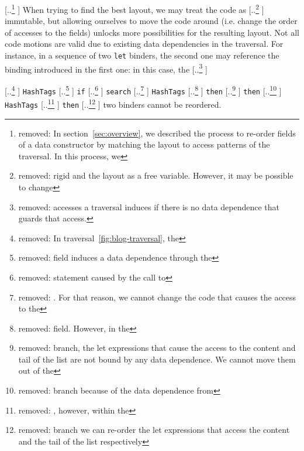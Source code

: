 \documentclass[acmsmall,review,anonymous]{acmart}\settopmatter{printfolios=true,printccs=false,printacmref=false}
\providecommand{\DIFaddtex}[1]{{\protect\color{blue} \sf #1}} %
\providecommand{\DIFdeltex}[1]{{\protect\color{red} [..\footnote{removed: #1} ]}} %
\providecommand{\DIFaddbegin}{} %
\providecommand{\DIFaddend}{} %
\providecommand{\DIFdelbegin}{} %
\providecommand{\DIFdelend}{} %
\providecommand{\DIFadd}[1]{\texorpdfstring{\DIFaddtex{#1}}{#1}} %
\providecommand{\DIFdel}[1]{\texorpdfstring{\DIFdeltex{#1}}{}} %
\newcommand{\DIFscaledelfig}{0.5}
\newlength{\DIFdelgraphicswidth} %
\newlength{\DIFdelgraphicsheight} %
\newcommand{\DIFaddincludegraphics}[2][]{{\color{blue}\fbox{\DIFOincludegraphics[#1]{#2}}}} %
\newcommand{\DIFdelincludegraphics}[2][]{%
\sbox{\DIFdelgraphicsbox}{\DIFOincludegraphics[#1]{#2}}%
\settoboxwidth{\DIFdelgraphicswidth}{\DIFdelgraphicsbox} %
\settoboxtotalheight{\DIFdelgraphicsheight}{\DIFdelgraphicsbox} %
\scalebox{\DIFscaledelfig}{%
\parbox[b]{\DIFdelgraphicswidth}{\usebox{\DIFdelgraphicsbox}\\[-\baselineskip] \rule{\DIFdelgraphicswidth}{0em}}\llap{\resizebox{\DIFdelgraphicswidth}{\DIFdelgraphicsheight}{%
\setlength{\unitlength}{\DIFdelgraphicswidth}%
\begin{picture}(1,1)%
\thicklines\linethickness{2pt} %
{\color[rgb]{1,0,0}\put(0,0){\framebox(1,1){}}}%
{\color[rgb]{1,0,0}\put(0,0){\line( 1,1){1}}}%
{\color[rgb]{1,0,0}\put(0,1){\line(1,-1){1}}}%
\end{picture}%
}\hspace*{3pt}}} %
} %
\DeclareRobustCommand{\DIFaddbegin}{\DIFOaddbegin \let\includegraphics\DIFaddincludegraphics} %
\DeclareRobustCommand{\DIFaddend}{\DIFOaddend \let\includegraphics\DIFOincludegraphics} %
\DeclareRobustCommand{\DIFdelbegin}{\DIFOdelbegin \let\includegraphics\DIFdelincludegraphics} %
\DeclareRobustCommand{\DIFdelend}{\DIFOaddend \let\includegraphics\DIFOincludegraphics} %
\begin{document}
\DIFdelbegin \DIFdel{In section~\ref{sec:overview}, we described the process to re-order fields of a data constructor 
by matching the layout to access patterns of the traversal. In this process, we }\DIFdelend \DIFaddbegin \DIFadd{When trying to find the best layout, we may }\DIFaddend treat the code as \DIFdelbegin \DIFdel{rigid and the layout as a free variable. However,
it may be possible to change }\DIFdelend \DIFaddbegin \DIFadd{immutable,
but allowing ourselves to move the code around (i.e. change the order of accesses to the fields)
unlocks more possibilities for the resulting layout.
Not all code motions are valid due to existing data dependencies in the traversal.
For instance, in a sequence of two }{\color{blue}%
\lstinline|let| %
}%
\DIFadd{binders, the second one may reference the binding introduced in the first one: in this case, }\DIFaddend the \DIFdelbegin \DIFdel{accesses a 
traversal induces if there is no data dependence that guards that access.
}%

\DIFdel{In traversal~\ref{fig:blog-traversal},
the }%
{\color{red}%
\lstinline|HashTags| %
}%
\DIFdel{field induces a data dependence through the }%
{\color{red}%
\lstinline|if| %
}%
\DIFdel{statement caused by the call
to }%
{\color{red}%
\lstinline|search|%
}%
\DIFdel{.
For that reason, we cannot change the code that causes the access to the }%
{\color{red}%
\lstinline|HashTags|
}%
\DIFdel{field.
However, in the }%
{\color{red}%
\lstinline|then| %
}%
\DIFdel{branch, the let expressions that cause the access to the content and tail of
the list are not bound by any data dependence. We cannot move them out of the }%
{\color{red}%
\lstinline|then| %
}%
\DIFdel{branch because of the
data dependence from }%
{\color{red}%
\lstinline|HashTags|%
}%
\DIFdel{, however, within the }%
{\color{red}%
\lstinline|then| %
}%
\DIFdel{branch we can re-order the let expressions
that access the content and the tail of the list respectively}\DIFdelend \DIFaddbegin \DIFadd{two binders cannot be reordered}\DIFaddend .
\end{document}
